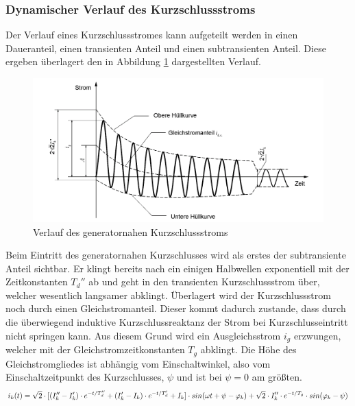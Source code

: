 \documentclass{scrartcl}
\begin{document}
\begin{onehalfspace}
\subsubsection{Dynamischer Verlauf des Kurzschlussstroms}
Der Verlauf eines Kurzschlussstromes kann aufgeteilt werden in einen Daueranteil, einen transienten Anteil und einen subtransienten Anteil. Diese ergeben überlagert den in Abbildung \ref{kss-verlauf-nah} dargestellten Verlauf.

	\begin{figure}[H]
	\centering
	\includegraphics[scale=0.5]{img/generatornah.png}
	\caption{Verlauf des generatornahen Kurzschlussstroms}
	\label{kss-verlauf-nah}
	\end{figure}

Beim Eintritt des generatornahen Kurzschlusses wird als erstes der subtransiente Anteil sichtbar. Er klingt bereits nach ein einigen Halbwellen exponentiell mit der Zeitkonstanten $T_d''$ ab und geht in den transienten Kurzschlussstrom über, welcher wesentlich langsamer abklingt. Überlagert wird der Kurzschlussstrom noch durch einen Gleichstromanteil. Dieser kommt dadurch zustande, dass durch die überwiegend induktive Kurzschlussreaktanz der Strom bei Kurzschlusseintritt nicht \glqq springen\grqq{} kann. Aus diesem Grund wird ein Ausgleichsstrom $i_g$ erzwungen, welcher mit der Gleichstromzeitkonstanten $T_g$ abklingt. Die Höhe des Gleichstromgliedes ist abhängig vom Einschaltwinkel, also vom Einschaltzeitpunkt des Kurzschlusses, $\psi$ und ist bei $\psi = 0$ am größten.
\begin{equation}
i_k(t) = \sqrt{2} \cdot [(I_k'' - I_k') \cdot e^{-t/T_d''} + (I_k' - I_k) \cdot e^{-t/T_d'} + I_k] \cdot sin(\omega t + \psi - \varphi_k) + \sqrt{2} \cdot I_k'' \cdot e^{-t/T_g} \cdot sin( \varphi_k - \psi)  \\
\end{equation}



\end{onehalfspace}
\end{document}
